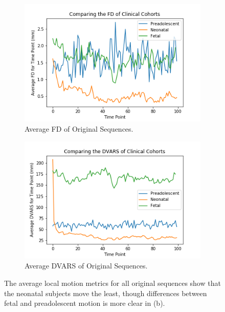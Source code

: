 \begin{figure}
	\centering
	\begin{subfigure}{0.4\textwidth}
		\centering
		\includegraphics[width=1.0\textwidth]{7/figures/orig-avg-fd.png}
		\caption{Average FD of Original Sequences.}
	\end{subfigure}
	\hspace{0.05\textwidth}
	\begin{subfigure}{0.4\textwidth}
		\centering
		\includegraphics[width=1.0\textwidth]{7/figures/orig-avg-dvars.png}
		\caption{Average DVARS of Original Sequences.}
	\end{subfigure}
	
\caption{The average local motion metrics for all original sequences show that the neonatal subjects move the least, though differences between fetal and preadolescent motion is more clear in (b).}
\label{fig:orig-local-motion}
\end{figure}

